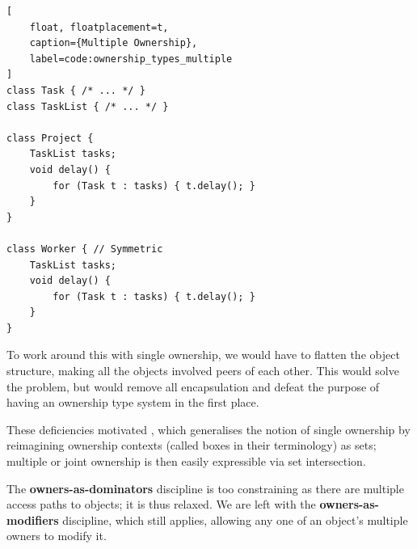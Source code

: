 \documentclass{acm_proc_article-sp}
\begin{document}
\begin{lstlisting}[
	float, floatplacement=t,
	caption={Multiple Ownership},
	label=code:ownership_types_multiple
]
class Task { /* ... */ }
class TaskList { /* ... */ }

class Project {
	TaskList tasks;
	void delay() {
		for (Task t : tasks) { t.delay(); }
	}
}

class Worker { // Symmetric
	TaskList tasks;
	void delay() {
		for (Task t : tasks) { t.delay(); }
	}
}
\end{lstlisting}

To work around this with single ownership, we would have to flatten the object
structure, making all the objects involved peers of each other. This would solve
the problem, but would remove all encapsulation and defeat the purpose of having
an ownership type system in the first place.

These deficiencies motivated \cite{cameron07mojo}, which generalises the notion
of single ownership by reimagining ownership contexts (called boxes in their
terminology) as sets; multiple or joint ownership is then easily expressible via
set intersection.

The \textbf{owners-as-dominators} discipline is too constraining as there are
multiple access paths to objects; it is thus relaxed. We are left with the
\textbf{owners-as-modifiers} discipline, which still applies, allowing any one
of an object's multiple owners to modify it.
\end{document}
